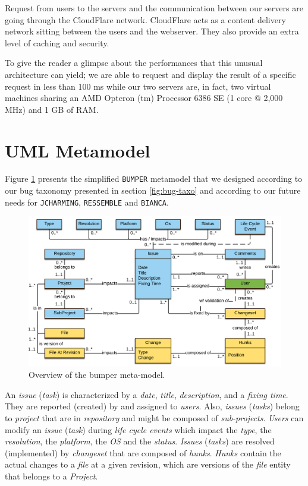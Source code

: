 Request from users to the servers and the communication between our servers are going through the CloudFlare network.
CloudFlare acts as a content delivery network sitting between the users and the webserver.
They also provide an extra level of caching and security.

To give the reader a glimpse about the performances that this unusual architecture can yield; we are able to request and display the result of a specific request in less than 100 ms while our two servers are, in fact, two virtual machines sharing an AMD Opteron (tm) Processor 6386 SE (1 core @ 2,000 MHz) and 1 GB of RAM.

\section{UML Metamodel}

Figure \ref{fig:bumper-approach} presents the simplified {\tt BUMPER} metamodel that we designed according to our bug taxonomy presented in section \ref{fig:bug-taxo} and according to our future needs for {\tt JCHARMING}, {\tt RESSEMBLE} and {\tt BIANCA}.

\begin{figure}[h!]
  \centering
    \includegraphics{media/bumper-model.png}
    \caption{Overview of the bumper meta-model.
    \label{fig:bumper-approach} }
\end{figure}


An {\it issue} ({\it task}) is characterized by a {\it date}, {\it title}, {\it description}, and a {\it fixing time}. They are reported (created) by and assigned to {\it users}.
Also, {\it issues} ({\it tasks}) belong to {\it project} that are in {\it repository} and might be composed of {\it sub-projects}.
{\it Users} can modify an {\it issue} ({\it task})  during {\it life cycle events} which impact the {\it type}, the {\it resolution}, the {\it platform}, the {\it OS} and the {\it status}. {\it Issues} ({\it tasks}) are resolved (implemented) by {\it changeset} that are composed of {\it hunks}. {\it Hunks} contain the actual changes to a {\it file} at a given revision, which are versions of the {\it file} entity that belongs to a {\it Project}.


